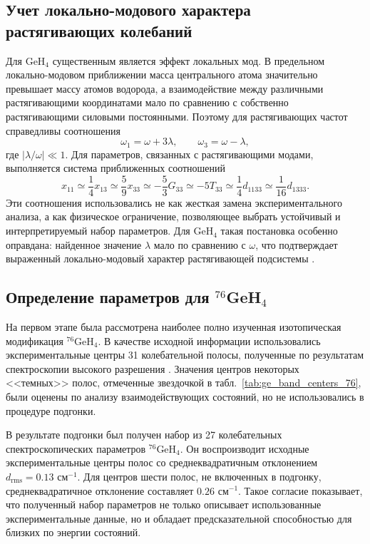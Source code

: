 \subsection{Учет локально-модового характера растягивающих колебаний}

Для GeH$_4$ существенным является эффект локальных мод. В предельном локально-модовом приближении
масса центрального атома значительно превышает массу атомов водорода, а взаимодействие между
различными растягивающими координатами мало по сравнению с собственно растягивающими силовыми
постоянными. Поэтому для растягивающих частот справедливы соотношения
\begin{equation}
\omega_1=\omega+3\lambda,\qquad \omega_3=\omega-\lambda,
\label{eq:ge_local_frequencies}
\end{equation}
где $|\lambda/\omega|\ll1$. Для параметров, связанных с растягивающими модами, выполняется система
приближенных соотношений
\begin{equation}
x_{11}\simeq\frac{1}{4}x_{13}\simeq\frac{5}{9}x_{33}\simeq
-\frac{5}{3}G_{33}\simeq-5T_{33}\simeq\frac{1}{4}d_{1133}\simeq
\frac{1}{16}d_{1333}.
\label{eq:ge_local_parameters}
\end{equation}
Эти соотношения использовались не как жесткая замена экспериментального анализа, а как физическое
ограничение, позволяющее выбрать устойчивый и интерпретируемый набор параметров. Для GeH$_4$ такая
постановка особенно оправдана: найденное значение $\lambda$ мало по сравнению с $\omega$, что
подтверждает выраженный локально-модовый характер растягивающей подсистемы \cite{301,302,303,304,305}.

\subsection{Определение параметров для ${}^{76}$GeH$_4$}

На первом этапе была рассмотрена наиболее полно изученная изотопическая модификация
${}^{76}$GeH$_4$. В качестве исходной информации использовались экспериментальные центры 31
колебательной полосы, полученные по результатам спектроскопии высокого разрешения
\cite{871,872,873,874,875,876}. Значения центров некоторых <<темных>> полос, отмеченные звездочкой в
табл.~\ref{tab:ge_band_centers_76}, были оценены по анализу взаимодействующих состояний, но не
использовались в процедуре подгонки.

В результате подгонки был получен набор из 27 колебательных спектроскопических параметров
${}^{76}$GeH$_4$. Он воспроизводит исходные экспериментальные центры полос со среднеквадратичным
отклонением $d_{\textrm{rms}}=0.13$ см$^{-1}$. Для центров шести полос, не включенных в подгонку,
среднеквадратичное отклонение составляет $0.26$ см$^{-1}$. Такое согласие показывает, что полученный
набор параметров не только описывает использованные экспериментальные данные, но и обладает
предсказательной способностью для близких по энергии состояний.

